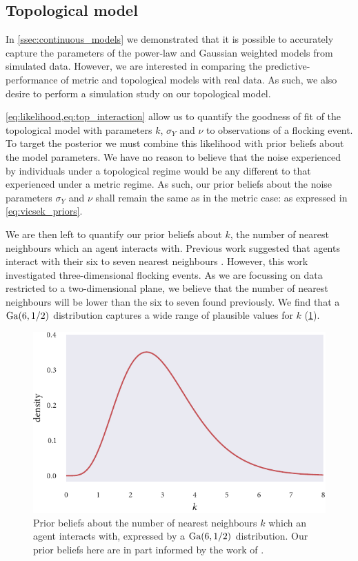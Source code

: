 \subsection{Topological model}

In \cref{ssec:continuous_models} we demonstrated that it is possible to
accurately capture the parameters of the power-law and Gaussian weighted models
from simulated data. However, we are interested in comparing the
predictive-performance of metric and topological models with real data. As
such, we also desire to perform a simulation study on our topological model.

\cref{eq:likelihood,eq:top_interaction} allow us to quantify the goodness of
fit of the topological model with parameters $k$, $\sigma_Y$ and $\nu$ to
observations of a flocking event. To target the posterior we must combine this
likelihood with prior beliefs about the model parameters. We have no reason to
believe that the noise experienced by individuals under a topological regime
would be any different to that experienced under a metric regime. As such, our
prior beliefs about the noise parameters $\sigma_Y$ and $\nu$ shall remain the
same as in the metric case: as expressed in \cref{eq:vicsek_priors}.

We are then left to quantify our prior beliefs about $k$, the number of nearest
neighbours which an agent interacts with. Previous work suggested that agents
interact with their six to seven nearest neighbours \parencite{ballerini08}.
However, this work investigated three-dimensional flocking events. As we are
focussing on data restricted to a two-dimensional plane, we believe that the
number of nearest neighbours will be lower than the six to seven found
previously. We find that a $\textrm{Ga}(6, 1/2)$ distribution captures a wide range of
plausible values for $k$ (\cref{fig:top_priors}).

\begin{figure}[tbp]
  \includegraphics{top_priors.pdf}
  \caption{Prior beliefs about the number of nearest neighbours $k$ which an
    agent interacts with, expressed by a $\textrm{Ga}(6, 1/2)$ distribution. Our prior
    beliefs here are in part informed by the work of \textcite{ballerini08}.}
  \label{fig:top_priors}
\end{figure}

